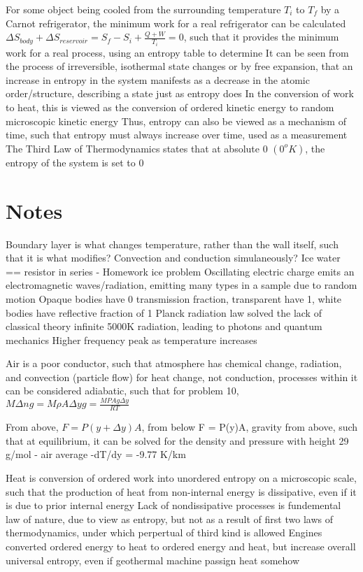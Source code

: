 \documentclass[11 pt, twoside]{article}
\newenvironment{outline*}
{
	\begin{outline}[enumerate]
	}
	{\end{outline}
}
\begin{document}
\begin{outline*}
\2 For some object being cooled from the surrounding temperature $T_i$ to $T_f$ by a Carnot refrigerator, the minimum work for a real refrigerator can be calculated
\3 $\Delta S_{body} + \Delta S_{reservoir} = S_f - S_i + \frac{Q + W}{T_i} = 0$, such that it provides the minimum work for a real process, using an entropy table to determine
\1 It can be seen from the process of irreversible, isothermal state changes or by free expansion, that an increase in entropy in the system manifests as a decrease in the atomic order/structure, describing a state just as entropy does
\2 In the conversion of work to heat, this is viewed as the conversion of ordered kinetic energy to random microscopic kinetic energy
\2 Thus, entropy can also be viewed as a mechanism of time, such that entropy must always increase over time, used as a measurement
\1 The Third Law of Thermodynamics states that at absolute 0 $(0^o K)$, the entropy of the system is set to 0
\end{outline*}
\section{Notes}
Boundary layer is what changes temperature, rather than the wall itself, such that it is what modifies? Convection and conduction simulaneously? Ice water == resistor in series - Homework ice problem
Oscillating electric charge emits an electromagnetic waves/radiation, emitting many types in a sample due to random motion
Opaque bodies have 0 transmission fraction, transparent have 1, white bodies have reflective fraction of 1
Planck radiation law solved the lack of classical theory infinite 5000K radiation, leading to photons and quantum mechanics
Higher frequency peak as temperature increases

Air is a poor conductor, such that atmosphere has chemical change, radiation, and convection (particle flow) for heat change, not conduction, processes within it can be considered adiabatic, such that for problem 10, $M\Delta ng = M\rho A\Delta yg = \frac{MPAg\Delta y}{RT}$

From above, $F = P(y + \Delta y)A$, from below F = P(y)A, gravity from above, such that at equilibrium, it can be solved for the density and pressure with height
29 g/mol - air average
-dT/dy = -9.77 K/km

Heat is conversion of ordered work into unordered entropy on a microscopic scale, such that the production of heat from non-internal energy is dissipative, even if it is due to prior internal energy
Lack of nondissipative processes is fundemental law of nature, due to view as entropy, but not as a result of first two laws of thermodynamics, under which perpertual of third kind is allowed
Engines converted ordered energy to heat to ordered energy and heat, but increase overall universal entropy, even if geothermal machine passign heat somehow
\end{document}
